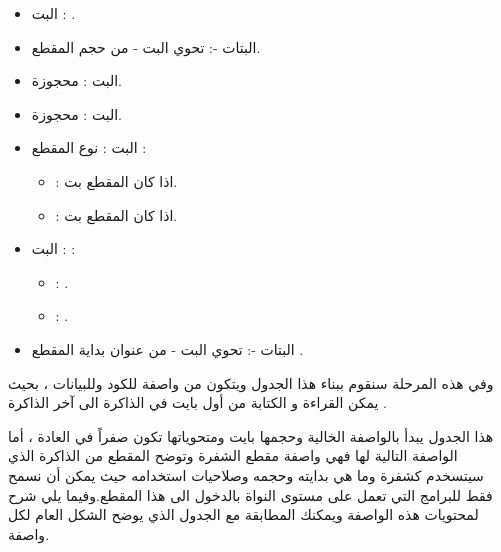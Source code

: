 \documentclass[document.tex]{subfiles}
\begin{document}
\begin{itemize}
\item البت : .
\item البتات -: تحوي البت  - من حجم المقطع.
\item البت : محجوزة.
\item البت : محجوزة.

\item البت : نوع المقطع :
\begin{itemize}
\item {}: اذا كان المقطع  بت.
\item {}: اذا كان المقطع  بت.

\end{itemize}

\item البت : :
\begin{itemize}
\item {}: .
\item {}: .

\end{itemize}

\item البتات -: تحوي البت  - من عنوان بداية المقطع .

\end{itemize}

وفي هذه المرحلة سنقوم ببناء هذا الجدول ويتكون من واصفة للكود وللبيانات ، بحيث يمكن القراءة و الكتابة من أول بايت في الذاكرة الى آخر الذاكرة . 

\begin{english}
\lstset{numberstyle=\tiny,numbers=left,stepnumber=1,numbersep=5pt,tabsize=2,extendedchars=true,breaklines=true,frame=b,showspaces=false, showtabs=false,xleftmargin=10pt,framexleftmargin=10pt,framexrightmargin=5pt,framexbottommargin=4pt,showstringspaces=false,language=[x86masm]Assembler}


\end{english}

هذا الجدول يبدأ بالواصفة الخالية  وحجمها  بايت ومتحوياتها تكون صفراً في العادة ، أما الواصفة التالية لها فهي واصفة مقطع الشفرة  وتوضح المقطع من الذاكرة الذي سيتسخدم كشفرة وما هي بدايته وحجمه وصلاحيات استخدامه حيث يمكن أن نسمح فقط للبرامج التي تعمل على مستوى النواة  بالدخول الى هذا المقطع.وفيما يلي شرح لمحتويات هذه الواصفة ويمكنك المطابقة مع الجدول الذي يوضح الشكل العام لكل واصفة.
\end{document}
